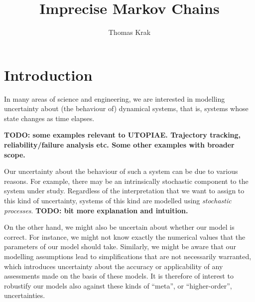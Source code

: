\documentclass[graybox]{svmult}
\begin{document}

\title{Imprecise Markov Chains}
\author{Thomas Krak}
%
%
\maketitle



\section{Introduction}

In many areas of science and engineering, we are interested in modelling uncertainty about (the behaviour of) dynamical systems, that is, systems whose state changes as time elapses.

{\bf TODO: some examples relevant to UTOPIAE. Trajectory tracking, reliability/failure analysis etc. Some other examples with broader scope.}

Our uncertainty about the behaviour of such a system can be due to various reasons. For example, there may be an intrinsically stochastic component to the system under study. Regardless of the interpretation that we want to assign to this kind of uncertainty, systems of this kind are modelled using \emph{stochastic processes}. {\bf TODO: bit more explanation and intuition.}

On the other hand, we might also be uncertain about whether our model is correct. For instance, we might not know exactly the numerical values that the parameters of our model should take. Similarly, we might be aware that our modelling assumptions lead to simplifications that are not necessarily warranted, which introduces uncertainty about the accuracy or applicability of any assessments made on the basis of these models. It is therefore of interest to robustify our models also against these kinds of ``meta'', or ``higher-order'', uncertainties.
\end{document}
